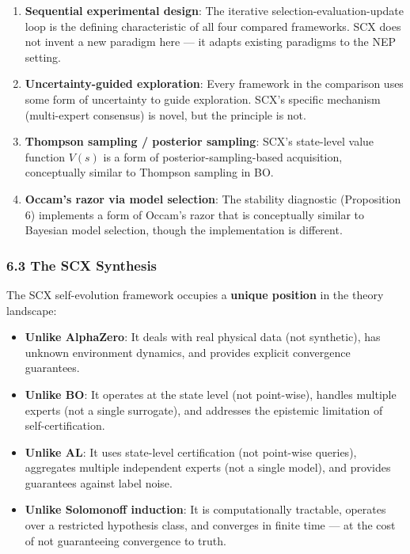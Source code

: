 \documentclass[
  12pt,
]{ctexart}
\providecommand{\tightlist}{%
  \setlength{\itemsep}{0pt}\setlength{\parskip}{0pt}}
\begin{document}
\begin{enumerate}
\def\labelenumi{\arabic{enumi}.}
\item
  \textbf{Sequential experimental design}: The iterative
  selection-evaluation-update loop is the defining characteristic of all
  four compared frameworks. SCX does not invent a new paradigm here ---
  it adapts existing paradigms to the NEP setting.
\item
  \textbf{Uncertainty-guided exploration}: Every framework in the
  comparison uses some form of uncertainty to guide exploration. SCX's
  specific mechanism (multi-expert consensus) is novel, but the
  principle is not.
\item
  \textbf{Thompson sampling / posterior sampling}: SCX's state-level
  value function \(V(s)\) is a form of posterior-sampling-based
  acquisition, conceptually similar to Thompson sampling in BO.
\item
  \textbf{Occam's razor via model selection}: The stability diagnostic
  (Proposition 6) implements a form of Occam's razor that is
  conceptually similar to Bayesian model selection, though the
  implementation is different.
\end{enumerate}

\subsubsection{6.3 The SCX Synthesis}\label{the-scx-synthesis}

The SCX self-evolution framework occupies a \textbf{unique position} in
the theory landscape:

\begin{itemize}
\tightlist
\item
  \textbf{Unlike AlphaZero}: It deals with real physical data (not
  synthetic), has unknown environment dynamics, and provides explicit
  convergence guarantees.
\item
  \textbf{Unlike BO}: It operates at the state level (not point-wise),
  handles multiple experts (not a single surrogate), and addresses the
  epistemic limitation of self-certification.
\item
  \textbf{Unlike AL}: It uses state-level certification (not point-wise
  queries), aggregates multiple independent experts (not a single
  model), and provides guarantees against label noise.
\item
  \textbf{Unlike Solomonoff induction}: It is computationally tractable,
  operates over a restricted hypothesis class, and converges in finite
  time --- at the cost of not guaranteeing convergence to truth.
\end{itemize}
\end{document}
